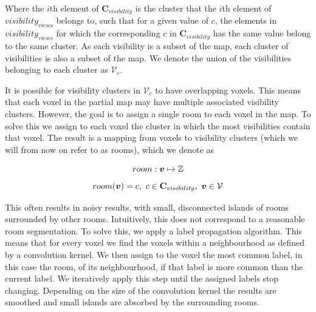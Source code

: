Where the \(i\)th element of \(\mathbf{C}_{visibility}\) is the cluster that the \(i\)th element of \(visibility_{views}\) belongs to, such that for a given value of \(c\), the elements in \(visibility_{views}\) for which the corresponding \(c\) in \(\mathbf{C}_{visibility}\) has the same value belong to the same cluster. As each visibility is a subset of the map, each cluster of visibilities is also a subset of the map. We denote the union of the visibilities belonging to each cluster as \(\mathcal{V}_{c}\). 

It is possible for visibility clusters in \(\mathcal{V}_{c}\) to have overlapping voxels. This means that each voxel in the partial map may have multiple associated visibility clusters. However, the goal is to assign a single room to each voxel in the map. To solve this we assign to each voxel the cluster in which the most visibilities contain that voxel. The result is a mapping from voxels to visibility clusters (which we will from now on refer to as rooms), which we denote as 

\begin{equation}
    \label{eq:room_01}
room: \boldsymbol{v} \mapsto \mathbb{Z}
\end{equation}
\begin{equation}
    \label{eq:room_02}
room(\boldsymbol{v}) = c,\ c \in \mathbf{C}_{visibility},\ \boldsymbol{v} \in \mathcal{V}
\end{equation}

This often results in noisy results, with small, disconnected islands of rooms surrounded by other rooms. Intuitively, this does not correspond to a reasonable room segmentation. To solve this, we apply a label propagation algorithm. This means that for every voxel we find the voxels within a neighbourhood as defined by a convolution kernel. We then assign to the voxel the most common label, in this case the room, of its neighbourhood, if that label is more common than the current label. We iteratively apply this step until the assigned labels stop changing. Depending on the size of the convolution kernel the results are smoothed and small islands are absorbed by the surrounding rooms.


